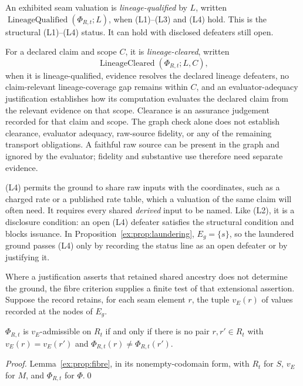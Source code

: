 \documentclass[smallextended,envcountsect,envcountsame,natbib]{svjour3}
\begin{document}
\begin{definition}\label{ex:def:lineage-qualified}
An exhibited seam valuation is \emph{lineage-qualified} by $L$, written $\operatorname{LineageQualified}(\Phi_{R,t};L)$, when (L1)--(L3) and (L4) hold. This is the structural (L1)--(L4) status. It can hold with disclosed defeaters still open.

For a declared claim and scope $C$, it is \emph{lineage-cleared}, written
\[
\operatorname{LineageCleared}(\Phi_{R,t};L,C),
\]
when it is lineage-qualified, evidence resolves the declared lineage defeaters, no claim-relevant lineage-coverage gap remains within $C$, and an evaluator-adequacy justification establishes how its computation evaluates the declared claim from the relevant evidence on that scope. Clearance is an assurance judgement recorded for that claim and scope. The graph check alone does not establish clearance, evaluator adequacy, raw-source fidelity, or any of the remaining transport obligations. A faithful raw source can be present in the graph and ignored by the evaluator; fidelity and substantive use therefore need separate evidence.
\end{definition}

(L4) permits the ground to share raw inputs with the coordinates, such as a charged rate or a published rate table, which a valuation of the same claim will often need. It requires every shared \emph{derived} input to be named. Like (L2), it is a disclosure condition: an open (L4) defeater satisfies the structural condition and blocks issuance. In Proposition~\ref{ex:prop:laundering}, $E_g=\{s\}$, so the laundered ground passes (L4) only by recording the status line as an open defeater or by justifying it.

Where a justification asserts that retained shared ancestry does not determine the ground, the fibre criterion supplies a finite test of that extensional assertion. Suppose the record retains, for each seam element $r$, the tuple $v_E(r)$ of values recorded at the nodes of $E_g$.

\begin{proposition}\label{ex:prop:laundering-test}
$\Phi_{R,t}$ is $v_E$-admissible on $R_t$ if and only if there is no pair $r,r'\in R_t$ with $v_E(r)=v_E(r')$ and $\Phi_{R,t}(r)\neq\Phi_{R,t}(r')$.
\end{proposition}
\begin{proof}
Lemma~\ref{ex:prop:fibre}, in its nonempty-codomain form, with $R_t$ for $S$, $v_E$ for $M$, and $\Phi_{R,t}$ for $\Phi$.\qed
\end{proof}
\end{document}
